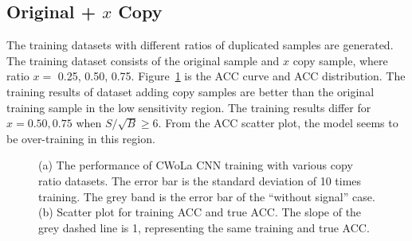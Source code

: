\documentclass[12pt]{article}
\begin{document}
    \subsection{Original + \texorpdfstring{$x$}{x} Copy}%
    \label{sub:original_x_copy}
        The training datasets with different ratios of duplicated samples are generated. The training dataset consists of the original sample and $x$ copy sample, where ratio $x=$ 0.25, 0.50, 0.75. Figure~\ref{fig:cwola_cnn_training_performance_copy_ratio} is the ACC curve and ACC distribution. The training results of dataset adding copy samples are better than the original training sample in the low sensitivity region. The training results differ for $x = 0.50, 0.75$ when $S / \sqrt{B} \ge 6$. From the ACC scatter plot, the model seems to be over-training in this region.
        \begin{figure}[htpb]
            \centering
            \caption{(a) The performance of CWoLa CNN training with various copy ratio datasets. The error bar is the standard deviation of 10 times training. The grey band is the error bar of the ``without signal'' case. (b) Scatter plot for training ACC and true ACC. The slope of the grey dashed line is 1, representing the same training and true ACC.}
            \label{fig:cwola_cnn_training_performance_copy_ratio}
        \end{figure}
\end{document}
